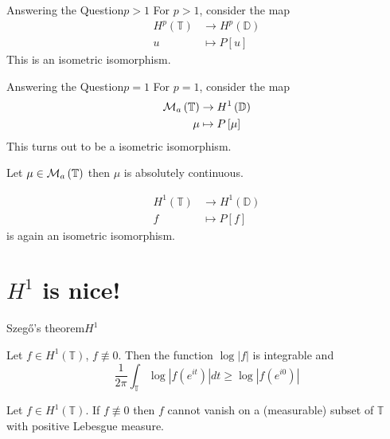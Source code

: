 \documentclass{beamer}
\numberwithin{equation}{subsection}
\newcommand{\D}{\mathbb D}
\newcommand{\T}{\mathbb T}
\newcommand{\calM}{{\cal M}}
\newcommand{\abs}[1]{\left\lvert #1 \right\rvert}
\begin{document}
\begin{frame}{Answering the Question}{$p>1$}
    For $p>1$, consider the map
    \begin{align*}
	H^{p} \left( \T \right) &\to H^{p} \left( \D \right) \\
	u &\mapsto P\left[ u \right]
    \end{align*}
    This is an isometric isomorphism.

\end{frame}
\begin{frame}{Answering the Question}{$p=1$}
    For $p=1$, consider the map
    \begin{align*}
	\calM_{a} \left( \T \right) &\to H^{1} \left( \D \right) \\
	\mu &\mapsto P\left[ \mu \right]
    \end{align*}
    This turns out to be a isometric isomorphism.

    \pause

    \begin{theorem}
	Let $\mu \in \calM_{a} \left( \T \right)$ then $\mu$ is absolutely continuous.
\end{theorem}

\pause

\begin{align*}
    H^{1} \left( \T \right) &\to H^{1} \left( \D \right) \\
    f &\mapsto P[f]
\end{align*}
is again an isometric isomorphism.
\end{frame}
\section{\texorpdfstring{$H^{1}$}{H1} is nice!}
\begin{frame}{Szegő's theorem}{$H^{1}$}
    \begin{theorem}[Szegő]
	Let $f\in H^{1} \left( \T \right)$, $f\not\equiv 0$. Then the function $\log \abs{f}$ is integrable and 
	\begin{equation*}
	    \frac{1}{2\pi} \int_{\T} \log \abs{f\left( e^{it} \right)} dt \ge \log \abs{f\left( e^{i0} \right)}
	\end{equation*}
    \end{theorem}
     \pause
     \begin{corollary}
	 Let $f\in H^{1} \left( \T\right)$. If $f\not\equiv 0$ then $f$ cannot vanish on a (measurable) subset of $\T$ with positive Lebesgue measure.
     \end{corollary}
\end{frame}
\end{document}
